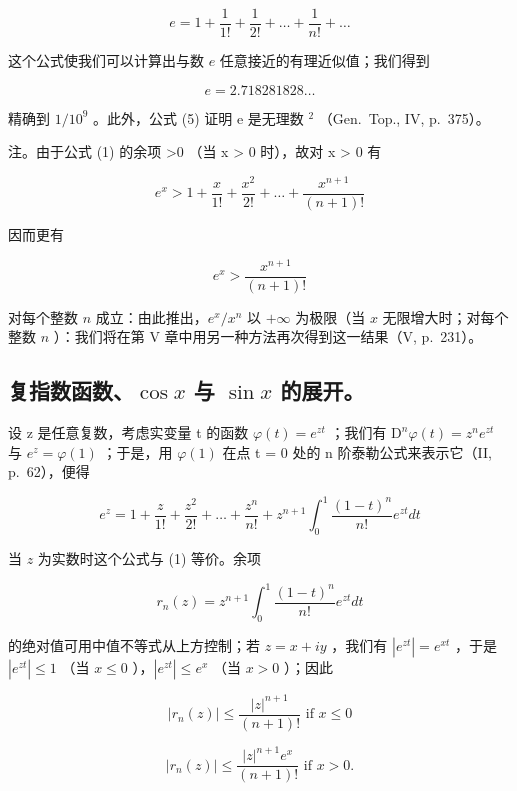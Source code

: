 \[
e = 1 + \frac {1}{1 !} + \frac {1}{2 !} + \dots + \frac {1}{n !} + \dots\tag{5}
\]

这个公式使我们可以计算出与数 \(e\) 任意接近的有理近似值；我们得到

\[
e = 2. 7 1 8   2 8 1   8 2 8 \dots
\]

精确到 \(1/10^{9}\) 。此外，公式 (5) 证明 e 是无理数 \(^{2}\) （Gen.~Top., IV, p.~375）。

注。由于公式 (1) 的余项 \textgreater0 （当 x \textgreater{} 0 时），故对 x \textgreater{} 0 有

\[
e ^ {x} > 1 + \frac {x}{1 !} + \frac {x ^ {2}}{2 !} + \dots + \frac {x ^ {n + 1}}{(n + 1) !}
\]

因而更有

\[
e ^ {x} > \frac {x ^ {n + 1}}{(n + 1) !}
\]

对每个整数 \(n\) 成立：由此推出，\(e^x / x^n\) 以 \(+\infty\) 为极限（当 \(x\) 无限增大时；对每个整数 \(n\) ）：我们将在第 V 章中用另一种方法再次得到这一结果（V, p.~231）。

\subsection{\texorpdfstring{复指数函数、\(\cos x\) 与 \(\sin x\) 的展开。}{复指数函数、cos x 与 sin x 的展开。}}

设 z 是任意复数，考虑实变量 t 的函数 \(\varphi(t) = e^{zt}\) ；我们有 \(\mathrm{D}^{n}\varphi(t) = z^{n}e^{zt}\) 与 \(e^{z} = \varphi(1)\) ；于是，用 \(\varphi(1)\) 在点 t = 0 处的 n 阶泰勒公式来表示它（II, p.~62），便得

\[
e ^ {z} = 1 + \frac {z}{1 !} + \frac {z ^ {2}}{2 !} + \dots + \frac {z ^ {n}}{n !} + z ^ {n + 1} \int_ {0} ^ {1} \frac {(1 - t) ^ {n}}{n !} e ^ {z t} d t\tag{6}
\]

当 \(z\) 为实数时这个公式与 (1) 等价。余项

\[
r _ {n} (z) = z ^ {n + 1} \int_ {0} ^ {1} \frac {(1 - t) ^ {n}}{n !} e ^ {z t} d t
\]

的绝对值可用中值不等式从上方控制；若 \(z = x + iy\) ，我们有 \(|e^{zt}| = e^{xt}\) ，于是 \(|e^{zt}| \leqslant 1\) （当 \(x \leqslant 0\) ），\(|e^{zt}| \leqslant e^x\) （当 \(x > 0\) ）；因此

\[
\left| r _ {n} (z) \right| \leqslant \frac {\left| z \right| ^ {n + 1}}{(n + 1) !} \text {   if   } x \leqslant 0\tag{7}
\]

\[
| r _ {n} (z) | \leqslant \frac {| z | ^ {n + 1} e ^ {x}}{(n + 1) !} \text {   if   } x > 0.\tag{8}
\]

